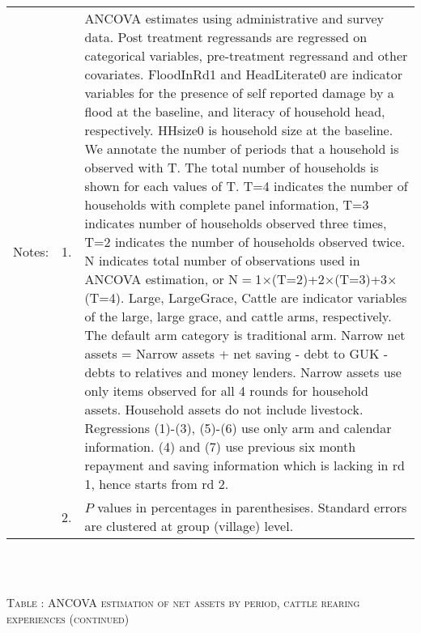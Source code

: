\begin{minipage}[t]{14cm}
\begin{tabular}{>{\hfill\scriptsize}p{1cm}<{}>{\hfill\scriptsize}p{.25cm}<{}>{\scriptsize}p{12cm}<{\hfill}}
Notes: & 1. & ANCOVA estimates using administrative and survey data. Post treatment regressands are regressed on categorical variables, pre-treatment regressand and other covariates. \textsf{FloodInRd1} and \textsf{HeadLiterate0} are indicator variables for the presence of self reported damage by a flood at the baseline, and literacy of household head, respectively. \textsf{HHsize0} is household size at the baseline. We annotate the number of periods that a household is observed with \textsf{T}. The total number of households is shown for each values of \textsf{T}. \textsf{T=4} indicates the number of households with complete panel information, \textsf{T=3} indicates number of households observed three times, \textsf{T=2} indicates the number of households observed twice. \textsf{N} indicates total number of observations used in ANCOVA estimation, or \textsf{N$=$1$\times$(T=2)+2$\times$(T=3)+3$\times$(T=4)}.  \textsf{Large}, \textsf{LargeGrace}, \textsf{Cattle} are indicator variables of the \textsf{large}, \textsf{large grace}, and \textsf{cattle} arms, respectively. The default arm category is \textsf{traditional} arm. Narrow net assets = Narrow assets + net saving - debt to GUK - debts to relatives and money lenders. Narrow assets use only items observed for all 4 rounds for household assets. Household assets do not include livestock. Regressions (1)-(3), (5)-(6) use only arm and calendar information. (4) and (7) use previous six month repayment and saving information which is lacking in rd 1, hence starts from rd 2.\\
& 2. &  $P$ values in percentages in parenthesises. Standard errors are clustered at group (village) level. %
 \end{tabular}
\end{minipage} \\\\\addtocounter{table}{-1}\hspace{-1cm}\begin{minipage}[t]{14cm} \hfil\textsc{\normalsize Table \thetable: ANCOVA estimation of net assets by period, cattle rearing experiences (continued) \label{tab ANCOVA narrow net assets Experience timevarying 2}}\\ \setlength{\tabcolsep}{1pt}
  \setlength{\baselineskip}{8pt}
  \renewcommand{\arraystretch}{.55}
  \hfil\begin{tikzpicture}

\end{tikzpicture}
\end{minipage}
